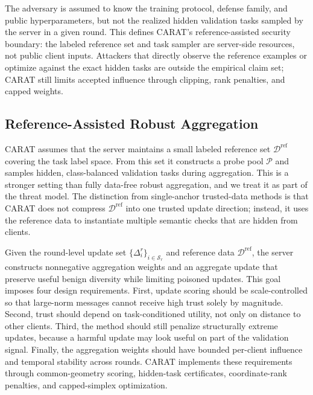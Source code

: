 The adversary is assumed to know the training protocol, defense family, and public hyperparameters, but not the realized hidden validation tasks sampled by the server in a given round. This defines CARAT's reference-assisted security boundary: the labeled reference set and task sampler are server-side resources, not public client inputs. Attackers that directly observe the reference examples or optimize against the exact hidden tasks are outside the empirical claim set; CARAT still limits accepted influence through clipping, rank penalties, and capped weights.

\subsection{Reference-Assisted Robust Aggregation}

CARAT assumes that the server maintains a small labeled reference set $\mathcal{D}^{\mathrm{ref}}$ covering the task label space. From this set it constructs a probe pool $\mathcal{P}$ and samples hidden, class-balanced validation tasks during aggregation. This is a stronger setting than fully data-free robust aggregation, and we treat it as part of the threat model. The distinction from single-anchor trusted-data methods is that CARAT does not compress $\mathcal{D}^{\mathrm{ref}}$ into one trusted update direction; instead, it uses the reference data to instantiate multiple semantic checks that are hidden from clients.

Given the round-level update set $\{\Delta_i^r\}_{i\in\mathcal{S}_r}$ and reference data $\mathcal{D}^{\mathrm{ref}}$, the server constructs nonnegative aggregation weights and an aggregate update that preserve useful benign diversity while limiting poisoned updates. This goal imposes four design requirements. First, update scoring should be scale-controlled so that large-norm messages cannot receive high trust solely by magnitude. Second, trust should depend on task-conditioned utility, not only on distance to other clients. Third, the method should still penalize structurally extreme updates, because a harmful update may look useful on part of the validation signal. Finally, the aggregation weights should have bounded per-client influence and temporal stability across rounds. CARAT implements these requirements through common-geometry scoring, hidden-task certificates, coordinate-rank penalties, and capped-simplex optimization.

